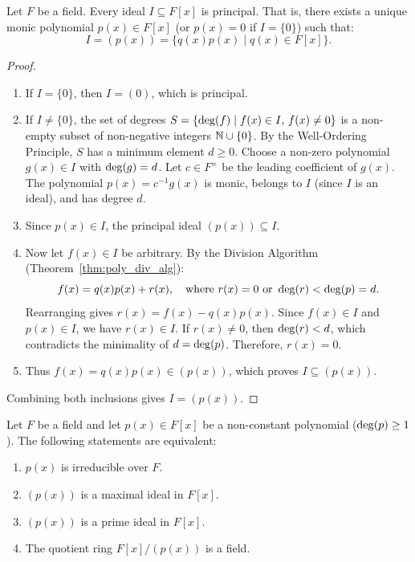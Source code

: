\begin{theorem}
\label{thm:poly_pid}
Let $F$ be a field. Every ideal $I \subseteq F[x]$ is principal. That is, there exists a unique monic polynomial $p(x) \in F[x]$ (or $p(x) = 0$ if $I = \{0\}$) such that:
\begin{equation}
I = (p(x)) = \{ q(x)p(x) \mid q(x) \in F[x] \}.
\end{equation}
\end{theorem}

\begin{proof}
\begin{enumerate}[label=\arabic*., leftmargin=*]
    \item If $I = \{0\}$, then $I = (0)$, which is principal.
    \item If $I \ne \{0\}$, the set of degrees $S = \{ \operatorname{deg}(f) \mid f(x) \in I, \, f(x) \ne 0 \}$ is a non-empty subset of non-negative integers $\mathbb{N} \cup \{0\}$.
    By the Well-Ordering Principle, $S$ has a minimum element $d \ge 0$.
    Choose a non-zero polynomial $g(x) \in I$ with $\operatorname{deg}(g) = d$.
    Let $c \in F^\times$ be the leading coefficient of $g(x)$.
    The polynomial $p(x) = c^{-1}g(x)$ is monic, belongs to $I$ (since $I$ is an ideal), and has degree $d$.
    
    \item Since $p(x) \in I$, the principal ideal $(p(x)) \subseteq I$.
    
    \item Now let $f(x) \in I$ be arbitrary.
    By the Division Algorithm (Theorem~\ref{thm:poly_div_alg}):
    \begin{equation*}
    f(x) = q(x)p(x) + r(x), \quad \text{where } r(x) = 0 \text{ or } \operatorname{deg}(r) < \operatorname{deg}(p) = d.
    \end{equation*}
    Rearranging gives $r(x) = f(x) - q(x)p(x)$.
    Since $f(x) \in I$ and $p(x) \in I$, we have $r(x) \in I$.
    If $r(x) \ne 0$, then $\operatorname{deg}(r) < d$, which contradicts the minimality of $d = \operatorname{deg}(p)$.
    Therefore, $r(x) = 0$.
    
    \item Thus $f(x) = q(x)p(x) \in (p(x))$, which proves $I \subseteq (p(x))$.
\end{enumerate}
Combining both inclusions gives $I = (p(x))$.
\end{proof}

\begin{theorem}
\label{thm:poly_irreducible_maximal}
Let $F$ be a field and let $p(x) \in F[x]$ be a non-constant polynomial ($\operatorname{deg}(p) \ge 1$). The following statements are equivalent:
\begin{enumerate}[label=\textbf{(\arabic*)}, leftmargin=*, itemsep=4pt]
    \item $p(x)$ is irreducible over $F$.
    \item $(p(x))$ is a maximal ideal in $F[x]$.
    \item $(p(x))$ is a prime ideal in $F[x]$.
    \item The quotient ring $F[x]/(p(x))$ is a field.
\end{enumerate}
\end{theorem}

